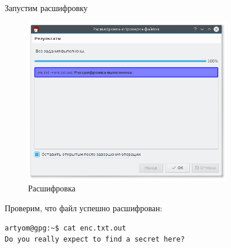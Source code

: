Запустим расшифровку

\begin{figure}[H]
	\centering
	\includegraphics[width=0.8\textwidth]{figures/screen23.png}
	\caption{Расшифровка}
\end{figure}

Проверим, что файл успешно расшифрован:

\begin{lstlisting}
artyom@gpg:~$ cat enc.txt.out 
Do you really expect to find a secret here?
\end{lstlisting}